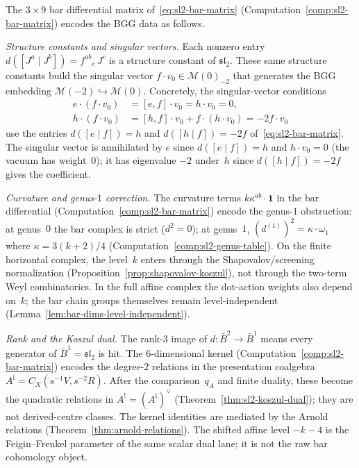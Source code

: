 \begin{computation}
\label{comp:bgg-from-bar-matrix}

The $3 \times 9$ bar differential matrix
of~\eqref{eq:sl2-bar-matrix}
(Computation~\ref{comp:sl2-bar-matrix}) encodes the
BGG data as follows.

\emph{Structure constants and singular vectors.}
Each nonzero entry
$d([J^a \mid J^b]) = {f^{ab}}_c\, J^c$ is a structure
constant of $\mathfrak{sl}_2$. These same structure
constants build the singular vector
$f \cdot v_0 \in \mathcal{M}(0)_{-2}$ that generates
the BGG embedding
$\mathcal{M}(-2) \hookrightarrow \mathcal{M}(0)$.
Concretely, the singular-vector conditions
\begin{align}
e \cdot (f \cdot v_0)
 &= [e, f] \cdot v_0 = h \cdot v_0 = 0,
 \label{eq:sv-check-e} \\
h \cdot (f \cdot v_0)
 &= [h, f] \cdot v_0 + f \cdot (h \cdot v_0)
 = -2f \cdot v_0
 \label{eq:sv-check-h}
\end{align}
use the entries $d([e \mid f]) = h$ and
$d([h \mid f]) = -2f$ of~\eqref{eq:sl2-bar-matrix}.
The singular vector is annihilated by $e$ since
$d([e \mid f]) = h$ and $h \cdot v_0 = 0$
(the vacuum has weight~$0$); it has eigenvalue $-2$
under~$h$ since $d([h \mid f]) = -2f$ gives the
coefficient.

\emph{Curvature and genus-$1$ correction.}\quad
The curvature terms $k\kappa^{ab} \cdot \mathbf{1}$
in the bar differential
(Computation~\ref{comp:sl2-bar-matrix}) encode the
genus-$1$ obstruction: at genus~$0$ the bar complex
is strict ($d^2 = 0$); at genus~$1$,
$(d^{(1)})^2 = \kappa \cdot \omega_1$ where
$\kappa = 3(k{+}2)/4$
(Computation~\ref{comp:sl2-genus-table}).
On the finite horizontal complex, the level~$k$ enters through the
Shapovalov/screening normalization
(Proposition~\ref{prop:shapovalov-koszul}), not through the
two-term Weyl combinatorics. In the full affine complex the
dot-action weights also depend on~$k$; the bar chain groups
themselves remain level-independent
(Lemma~\ref{lem:bar-dims-level-independent}).

\emph{Rank and the Koszul dual.}
The rank-$3$ image of $d\colon \bar{B}^2 \to \bar{B}^1$
means every generator of
$\bar{B}^1 = \mathfrak{sl}_2$ is hit.
The $6$-dimensional kernel
(Computation~\ref{comp:sl2-bar-matrix}) encodes the
degree-$2$ relations in the presentation coalgebra
$A^{\mathrm i}=C_X(s^{-1}V,s^{-2}R)$. After the comparison~$q_A$ and
finite duality, these become the quadratic relations in
$A^!=(A^{\mathrm i})^\vee$
(Theorem~\ref{thm:sl2-koszul-dual}); they are not derived-centre
classes. The kernel identities are mediated by the Arnold relations
(Theorem~\ref{thm:arnold-relations}).
The shifted affine level $-k-4$ is the Feigin--Frenkel parameter of
the same scalar dual lane; it is not the raw bar cohomology object.
\end{computation}


